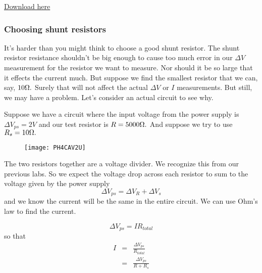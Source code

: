\href{https://dtoliphant.github.io/PH250Manual/Code/OhmsLaw_SimpleVA.ino}{Download here}


\subsubsection{Choosing shunt resistors}

It's harder than you might think to choose a good shunt resistor. The shunt
resistor resistance shouldn't be big enough to cause too much error in our $%
\Delta V$ measurement for the resistor we want to measure. Nor should it be
so large that it effects the current much. But suppose we find the smallest
resistor that we can, say, $10\unit{%
\Omega%
}.$ Surely that will not affect the actual $\Delta V$ or $I$ measurements.
But still, we may have a problem. Let's consider an actual circuit to see
why.

Suppose we have a circuit where the input voltage from the power supply is $%
\Delta V_{ps}=2\unit{V}$ and our test resistor is $R=5000\unit{%
\Omega%
}.$ And suppose we try to use $R_{s}=10\unit{%
\Omega%
}.$ \begin{figure}[h!]
\texttt{[image: PH4CAV2U]}
\end{figure}

The two resistors together are a voltage divider. We recognize this from our
previous labs. So we expect the voltage drop across each resistor to sum to
the voltage given by the power supply%
\begin{equation*}
\Delta V_{ps}=\Delta V_{R}+\Delta V_{s}
\end{equation*}%
and we know the current will be the same in the entire circuit. We can use
Ohm's law to find the current.

\begin{equation*}
\Delta V_{ps}=IR_{total}
\end{equation*}%
so that 
\begin{eqnarray*}
I &=&\frac{\Delta V_{ps}}{R_{total}} \\
&=&\frac{\Delta V_{ps}}{R+R_{s}}
\end{eqnarray*}

